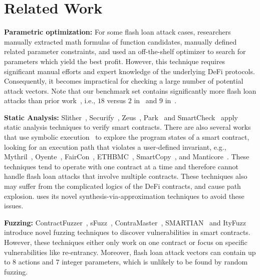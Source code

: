 \vspace{-2mm}
\section{Related Work}
\label{sec:related}

\noindent \textbf{Parametric optimization:} For some flash loan attack cases,
researchers~\cite{cao2021flashot, qin2021attacking} manually extracted math formulas
of function candidates, manually defined related parameter constraints, and 
used an off-the-shelf optimizer to search for parameters which yield the best profit. 
However, this technique requires
significant manual efforts and expert knowledge of the underlying DeFi
protocols. Consequently, it becomes impractical for checking a large number of potential attack vectors. 
Note that our benchmark set contains significantly more flash loan attacks than 
prior work~\cite{qin2021attacking,cao2021flashot}, i.e., $18$ versus $2$ in~\cite{qin2021attacking} and $9$ in~\cite{cao2021flashot}. 

\noindent \textbf{Static Analysis:} 
Slither~\cite{feist2019slither}, Securify~\cite{tsankov2018securify},
Zeus~\cite{kalra2018zeus}, Park~\cite{zheng2022park} and
SmartCheck~\cite{tikhomirov2018smartcheck} apply static analysis techniques to
verify smart contracts. 
There are also several works that use
symbolic execution~\cite{king1976symbolic} to explore the program states of a
smart contract, looking for an execution path that violates a user-defined
invariant, e.g., Mythril~\cite{mythril}, Oyente~\cite{luu2016making},
FairCon~\cite{liu2020towards}, ETHBMC~\cite{frank2020ethbmc},
SmartCopy~\cite{feng2019precise}, and Manticore~\cite{mossberg2019manticore}.
These techniques tend to operate with one contract at a time and therefore cannot handle flash loan attacks that involve multiple contracts.
These techniques also may suffer from the complicated logics of the DeFi contracts, and cause
path explosion.
{\name} uses its novel synthesis-via-approximation techniques to avoid these issues. 


\noindent \textbf{Fuzzing:}
ContractFuzzer~\cite{jiang2018contractfuzzer}, sFuzz~\cite{nguyen2020sfuzz},
ContraMaster~\cite{wang2020oracle}, SMARTIAN~\cite{choi2021smartian} and ItyFuzz~\cite{shou2023ityfuzz}
introduce novel fuzzing techniques to discover vulnerabilities in smart
contracts. However, these techniques either only work on one contract or focus
on specific vulnerabilities like re-entrancy. Moreover, flash loan attack vectors can contain 
up to $8$ actions and $7$ integer parameters, which is unlikely to be found by random fuzzing. 


